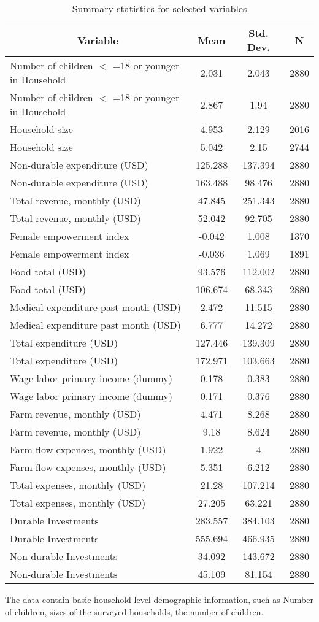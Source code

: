 \documentclass[11pt]{article}
\begin{document}
    \begin{table}[h]\centering \caption{Summary statistics for selected variables  \label{sumstat}}
	\begin{tabular}{l c c  c}\hline\hline
		\multicolumn{1}{c}{\textbf{Variable}} & \textbf{Mean}
		& \textbf{Std. Dev.} & \textbf{N}\\ \hline
    		Number of children $<$ =18 or younger in Household & 2.031 & 2.043  & 2880\\
    		Number of children $<$ =18 or younger in Household & 2.867 & 1.94  & 2880\\
    		Household size & 4.953 & 2.129  & 2016\\
    		Household size & 5.042 & 2.15  & 2744\\
    		Non-durable expenditure (USD) & 125.288 & 137.394  & 2880\\
    		Non-durable expenditure (USD) & 163.488 & 98.476  & 2880\\
    		Total revenue, monthly (USD) & 47.845 & 251.343  & 2880\\
    		Total revenue, monthly (USD) & 52.042 & 92.705  & 2880\\
    		Female empowerment index & -0.042 & 1.008  & 1370\\
    		Female empowerment index & -0.036 & 1.069  & 1891\\
    		Food total (USD) & 93.576 & 112.002  & 2880\\
    		Food total (USD) & 106.674 & 68.343  & 2880\\
    		Medical expenditure past month (USD) & 2.472 & 11.515  & 2880\\
    		Medical expenditure past month (USD) & 6.777 & 14.272  & 2880\\
    		Total expenditure (USD) & 127.446 & 139.309  & 2880\\
    		Total expenditure (USD) & 172.971 & 103.663  & 2880\\
    		Wage labor primary income (dummy) & 0.178 & 0.383  & 2880\\
    		Wage labor primary income (dummy) & 0.171 & 0.376  & 2880\\
    		Farm revenue, monthly (USD) & 4.471 & 8.268  & 2880\\
    		Farm revenue, monthly (USD) & 9.18 & 8.624  & 2880\\
    		Farm flow expenses, monthly (USD) & 1.922 & 4  & 2880\\
    		Farm flow expenses, monthly (USD) & 5.351 & 6.212  & 2880\\
    		Total expenses, monthly (USD) & 21.28 & 107.214  & 2880\\
    		Total expenses, monthly (USD) & 27.205 & 63.221  & 2880\\
    		Durable Investments & 283.557 & 384.103  & 2880\\
    		Durable Investments & 555.694 & 466.935  & 2880\\
    		Non-durable Investments & 34.092 & 143.672  & 2880\\
    		Non-durable Investments & 45.109 & 81.154  & 2880\\
    		\hline
    	\end{tabular}
    \end{table}

 The data contain basic household level demographic information, such as Number of children, sizes of the surveyed households, the number of children.  
    
\end{document}
